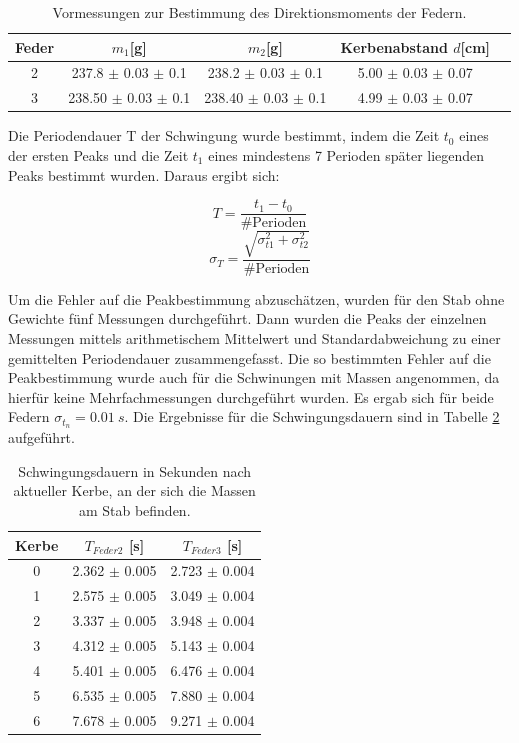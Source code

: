 \documentclass[12pt,a4paper]{article}
\begin{document}
\begin{table}
\caption{Vormessungen zur Bestimmung des Direktionsmoments der Federn.}
\begin{center}
\begin{tabular}{|c|c|c|c|c|}
\hline
Feder & $m_1$[g] & $m_2$[g] & Kerbenabstand $d$[cm]\\
\hline
2 & 237.8 $\pm$ 0.03 $\pm$ 0.1 & 238.2 $\pm$ 0.03 $\pm$ 0.1 & 5.00 $\pm$ 0.03 $\pm$ 0.07 \\
\hline
3 & 238.50 $\pm$ 0.03 $\pm$ 0.1 & 238.40 $\pm$ 0.03 $\pm$ 0.1 & 4.99 $\pm$ 0.03 $\pm$ 0.07\\ 
\hline
\end{tabular}
\end{center}
\label{tab:Vormessungen}
\end{table}



Die Periodendauer T der Schwingung wurde bestimmt, indem die Zeit $t_0$ eines der ersten Peaks und die Zeit $t_1$ eines mindestens 7 Perioden später liegenden Peaks bestimmt wurden. Daraus ergibt sich:

\begin{equation}
T = \frac{t_1 -t_0}{\text{\#Perioden}}
\end{equation}
\begin{equation}
\sigma_T = \frac{\sqrt{\sigma_{t1}^2 + \sigma_{t2}^2}}{\text{\#Perioden}}
\end{equation}

Um die Fehler auf die Peakbestimmung abzuschätzen, wurden für den Stab ohne Gewichte fünf Messungen durchgeführt. Dann wurden die Peaks der einzelnen Messungen mittels arithmetischem Mittelwert und Standardabweichung zu einer gemittelten Periodendauer zusammengefasst. Die so bestimmten Fehler auf die Peakbestimmung wurde auch für die Schwinungen mit Massen angenommen, da hierfür keine Mehrfachmessungen durchgeführt wurden. Es ergab sich für beide Federn $\sigma_{t_n} = \SI{0.01}{s}$.
Die Ergebnisse für die Schwingungsdauern sind in Tabelle \ref{tab:D_T} aufgeführt.


\begin{table}
	\centering
	\caption{Schwingungsdauern in Sekunden nach aktueller Kerbe, an der sich die Massen am Stab befinden.}
	\label{tab:D_T}
	\begin{tabular}{|c|c|c|}
		\hline
		Kerbe & $T_{Feder 2}$ [s] & $T_{Feder 3}$ [s] \\
		\hline
		0 & 2.362 $\pm$ 0.005 & 2.723 $\pm$ 0.004 \\
		\hline
		1 & 2.575 $\pm$ 0.005 & 3.049 $\pm$ 0.004 \\
		\hline
		2 & 3.337 $\pm$ 0.005 & 3.948 $\pm$ 0.004 \\
		\hline
		3 & 4.312 $\pm$ 0.005 & 5.143 $\pm$ 0.004 \\
		\hline
		4 & 5.401 $\pm$ 0.005 & 6.476 $\pm$ 0.004 \\
		\hline
		5 & 6.535 $\pm$ 0.005 & 7.880 $\pm$ 0.004 \\
		\hline
		6 & 7.678 $\pm$ 0.005 & 9.271 $\pm$ 0.004 \\
		\hline
	\end{tabular}
\end{table}
\end{document}
